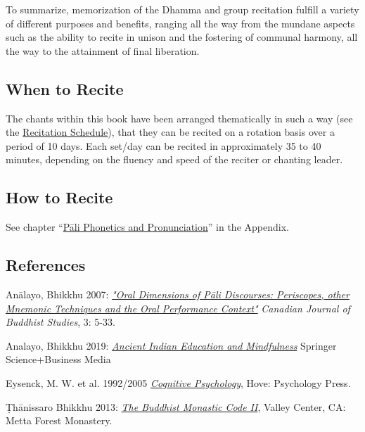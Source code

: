 To summarize, memorization of the Dhamma and group recitation fulfill a variety of different purposes and benefits, ranging all the way from the mundane aspects such as the ability to recite in unison and the fostering of communal harmony, all the way to the attainment of final liberation.

\subsection*{When to Recite}

The chants within this book have been arranged thematically in such a way (see the \hyperref[schedule]{Recitation Schedule}), that they can be recited on a rotation basis over a period of 10 days. Each set/day can be recited in approximately 35 to 40 minutes, depending on the fluency and speed of the reciter or chanting leader.

\subsection*{How to Recite}

See chapter ``\hyperref[phonetics]{Pāli Phonetics and Pronunciation}'' in the Appendix.

\subsection*{References}

Anālayo, Bhikkhu 2007: \href{https://www.buddhismuskunde.uni-hamburg.de/pdf/5-personen/analayo/oral-dimensions.pdf}{\textit{"Oral Dimensions of Pāli Discourses: Periscopes, other Mnemonic Techniques and the Oral Performance Context"}} \textit{Canadian Journal of Buddhist Studies}, 3: 5-33.

Analayo, Bhikkhu 2019: \href{https://www.buddhismuskunde.uni-hamburg.de/pdf/5-personen/analayo/ancientindianeducation.pdf}{\textit{Ancient Indian Education and Mindfulness}} Springer Science+Business Media

Eysenck, M. W. et al. 1992/2005 \href{https://psycnet.apa.org/record/2015-09422-000}{\textit{Cognitive Psychology}}, Hove: Psychology Press.

Ṭhānissaro Bhikkhu 2013:  \href{https://www.dhammatalks.org/Archive/Writings/Ebooks/BMC1&2_200826.pdf}{\textit{The Buddhist Monastic Code II}}, Valley Center, CA: Metta Forest Monastery.
